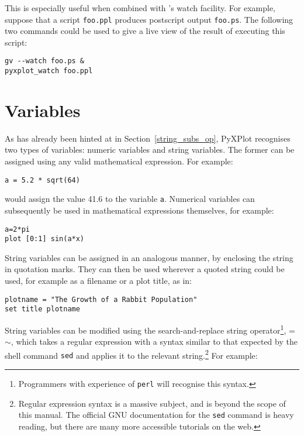 This is especially useful when combined with \ghostview's
watch facility. For example, suppose that a script {\tt foo.ppl} produces
postscript output {\tt foo.ps}. The following two commands could be used to
give a live view of the result of executing this script:

\begin{verbatim}
gv --watch foo.ps &
pyxplot_watch foo.ppl
\end{verbatim}

\section{Variables}

As has already been hinted at in Section~\ref{string_subs_op}, PyXPlot
recognises two types of variables: numeric variables and string variables.  The
former can be assigned using any valid mathematical expression. For example:

\begin{verbatim}
a = 5.2 * sqrt(64)
\end{verbatim}

\noindent would assign the value 41.6 to the variable {\tt a}.  Numerical variables can
subsequently be used in mathematical expressions themselves, for example:

\begin{verbatim}
a=2*pi
plot [0:1] sin(a*x)
\end{verbatim}

\noindent String variables can be assigned in an analogous manner, by enclosing
the string in quotation marks. They can then be used wherever a quoted string
could be used, for example as a filename or a plot title, as
in:

\begin{verbatim}
plotname = "The Growth of a Rabbit Population"
set title plotname
\end{verbatim}

String variables can be modified using the search-and-replace string
operator\footnote{Programmers with
experience of {\tt perl} will recognise this syntax.}, =$\sim$, which takes a regular expression with a syntax similar to that
expected by the shell command {\tt sed} and applies it to the relevant string.\footnote{Regular expression
syntax is a massive subject, and is beyond the scope of this manual. The
official GNU documentation for the {\tt sed} command is heavy reading, but
there are many more accessible tutorials on the web.} For example:

